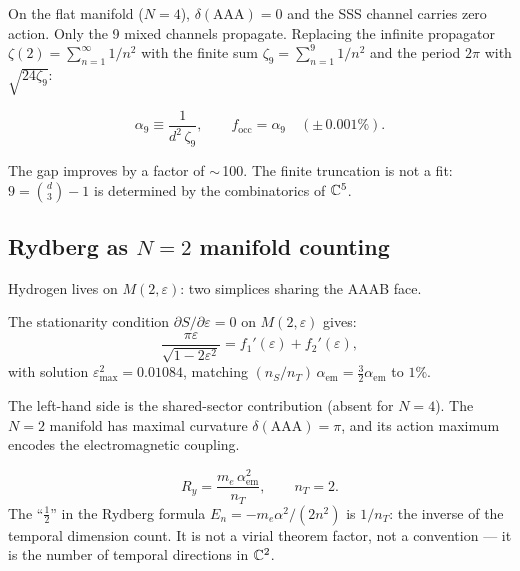 On the flat manifold ($N=4$), $\delta(\mathrm{AAA}) = 0$ and the SSS channel carries zero action.  Only the 9 mixed channels propagate.  Replacing the infinite propagator $\zeta(2) = \sum_{n=1}^\infty 1/n^2$ with the finite sum $\zeta_9 = \sum_{n=1}^9 1/n^2$ and the period $2\pi$ with $\sqrt{24\zeta_9}$:

\begin{equation}
\alpha_9 \equiv \frac{1}{d^2\,\zeta_9}, \qquad
f_\mathrm{occ} = \alpha_9 \quad (\pm\,0.001\%).
\end{equation}

The gap improves by a factor of $\sim$\,100.  The finite truncation is not a fit: $9 = \binom{d}{3} - 1$ is determined by the combinatorics of $\mathbb{C}^5$.

\subsection{Rydberg as $N=2$ manifold counting}
\label{sec:rydberg_N2}

Hydrogen lives on $M(2,\varepsilon)$: two simplices sharing the AAAB face.

\begin{theorem}[$N=2$ stationarity]
\label{thm:N2_stationarity}
The stationarity condition $\partial S/\partial\varepsilon = 0$ on $M(2,\varepsilon)$ gives:
\begin{equation}
\frac{\pi\varepsilon}{\sqrt{1 - 2\varepsilon^2}} = f_1'(\varepsilon) + f_2'(\varepsilon),
\end{equation}
with solution $\varepsilon_{\max}^2 = 0.01084$, matching $(n_S/n_T)\,\alpha_\text{em} = \tfrac{3}{2}\alpha_\text{em}$ to $1\%$.
\end{theorem}

The left-hand side is the shared-sector contribution (absent for $N=4$).  The $N=2$ manifold has maximal curvature $\delta(\mathrm{AAA}) = \pi$, and its action maximum encodes the electromagnetic coupling.

\begin{theorem}
\label{thm:rydberg_counting}
\begin{equation}
\boxed{R_y = \frac{m_e\,\alpha_\text{em}^2}{n_T}, \qquad n_T = 2.}
\end{equation}
The ``$\tfrac{1}{2}$'' in the Rydberg formula $E_n = -m_e\alpha^2/(2n^2)$ is $1/n_T$: the inverse of the temporal dimension count.  It is not a virial theorem factor, not a convention --- it is the number of temporal directions in $\mathbb{C}^2$.
\end{theorem}


